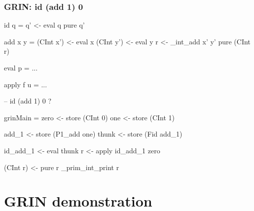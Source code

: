 \documentclass[bigger,aspectratio=169]{beamer}
\begin{document}
\begin{frame}[fragile]
\frametitle{GRIN: id (add 1) 0}
\begin{center}

	\begin{minipage}{0.40\textwidth}
		\begin{haskellcode}
			id q =
			 q' <- eval q
			 pure q'
		\end{haskellcode}
		\begin{haskellcode}
			add x y =
			 (CInt x') <- eval x
			 (CInt y') <- eval y
			 r <- _int_add x' y'
			 pure (CInt r)
		\end{haskellcode}
		\begin{haskellcode}
			eval p = ...
		\end{haskellcode}
		\begin{haskellcode}
			apply f u = ...
		\end{haskellcode}
	\end{minipage}
	\hfill
	\begin{minipage}{0.55\textwidth}
		\begin{haskellcode}
			-- id (add 1) 0 ?
		\end{haskellcode}
		\vspace{-0.60cm}
		\pause
		\begin{haskellcode}
		grinMain =
		 zero <- store (CInt 0)
		 one  <- store (CInt 1)

		 add_1 <- store (P1_add one)
		 thunk <- store (Fid add_1)

		 id_add_1 <- eval thunk
		 r <- apply id_add_1 zero

		 (CInt r) <- pure r
		 _prim_int_print r
		\end{haskellcode}
	\end{minipage}

\end{center}
\end{frame}

\section{GRIN demonstration}
\end{document}
